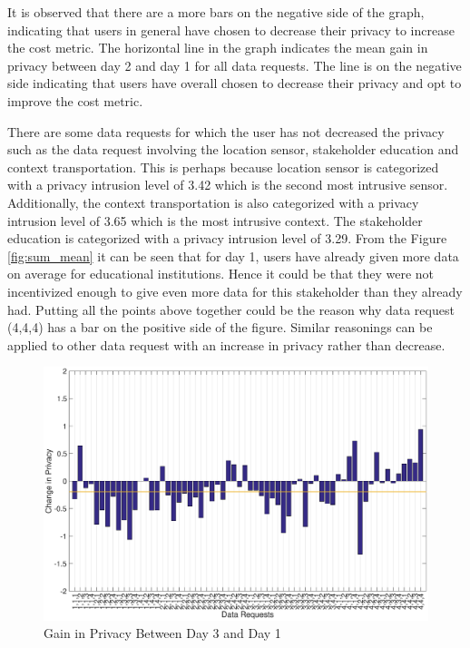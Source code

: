 It is observed that there are a more bars on the negative side of the graph, indicating that users in general have chosen to decrease their privacy to increase the cost metric. The horizontal line in the graph indicates the mean gain in privacy between day 2 and day 1 for all data requests. The line is on the negative side indicating that users have overall chosen to decrease their privacy and opt to improve the cost metric. 

There are some data requests for which the user has not decreased the privacy such as the data request involving the location sensor, stakeholder education and context transportation. This is perhaps because location sensor is categorized with a privacy intrusion level of 3.42 which is the second most intrusive sensor. Additionally, the context transportation is also categorized with a privacy intrusion level of 3.65 which is the most intrusive context. The stakeholder education is categorized with a privacy intrusion level of 3.29. From the Figure \ref{fig:sum_mean} it can be seen that for day 1, users have already given more data on average for educational institutions. Hence it could be that they were not incentivized enough to give even more data for this stakeholder than they already had. Putting all the points above together could be the reason why data request (4,4,4) has a bar on the positive side of the figure. Similar reasonings can be applied to other data request with an increase in privacy rather than decrease.

\begin{figure}[ht!]
\centering
\includegraphics[width=\textwidth]{./images/day3_day1}
\caption{Gain in Privacy Between Day 3 and Day 1}
\label{fig:day3_day1}
\end{figure}

